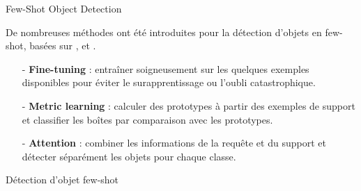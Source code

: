 \begin{subsectionframemod}{Few-Shot Object Detection}

    De nombreuses méthodes ont été introduites pour la détection d'objets en few-shot, basées sur ,  et .
    \begin{itemize}
        \item[-] \textbf{Fine-tuning} : entraîner soigneusement sur les quelques exemples disponibles pour éviter le surapprentissage ou l'oubli catastrophique.
        \item[-] \textbf{Metric learning} : calculer des prototypes à partir des exemples de support et classifier les boîtes par comparaison avec les prototypes.
        \item[-] \textbf{Attention} : combiner les informations de la requête et du support et détecter séparément les objets pour chaque classe.
    \end{itemize}
    
\end{subsectionframemod}


\begin{subsectionframemod}{Détection d'objet few-shot}
    
    \vspace{-3mm}
    
\end{subsectionframemod}
